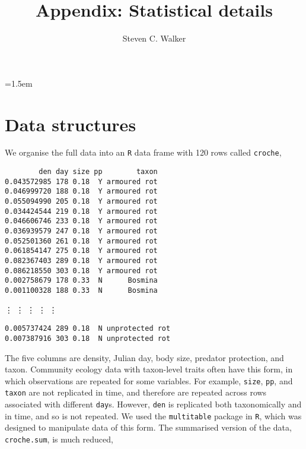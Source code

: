 \documentclass[12pt]{ecologyFORAPPENDIX}
\title{Appendix:  Statistical details}
\author{Steven C. Walker}
\begin{document}
\maketitle
\raggedright
\parindent=1.5em



\section{Data structures}

We organise the full data into an \texttt{R} data frame with 120 rows called \texttt{croche},
\vspace{-18pt}
\singlespace
\begin{verbatim}
        den day size pp        taxon
0.043572985 178 0.18  Y armoured rot
0.046999720 188 0.18  Y armoured rot
0.055094990 205 0.18  Y armoured rot
0.034424544 219 0.18  Y armoured rot
0.046606746 233 0.18  Y armoured rot
0.036939579 247 0.18  Y armoured rot
0.052501360 261 0.18  Y armoured rot
0.061854147 275 0.18  Y armoured rot
0.082367403 289 0.18  Y armoured rot
0.086218550 303 0.18  Y armoured rot
0.002758679 178 0.33  N      Bosmina
0.001100328 188 0.33  N      Bosmina
\end{verbatim}
\vspace{-13pt}
\hspace{35pt}
\vdots
\hspace{38pt}
\vdots
\hspace{20pt}
\vdots
\hspace{18pt}
\vdots
\hspace{40pt}
\vdots
\vspace{-10pt}
\begin{verbatim}
0.005737424 289 0.18  N unprotected rot
0.007387916 303 0.18  N unprotected rot
\end{verbatim}
\doublespace

\noindent The five columns are density, Julian day, body size, predator protection, and taxon.  Community ecology data with taxon-level traits often have this form, in which observations are repeated for some variables.  For example, \texttt{size}, \texttt{pp}, and \texttt{taxon} are not replicated in time, and therefore are repeated across rows associated with different \texttt{day}s.  However, \texttt{den} is replicated both taxonomically and in time, and so is not repeated.  We used the \texttt{multitable} package in \texttt{R}, which was designed to manipulate data of this form.  The summarised version of the data, \texttt{croche.sum}, is much reduced,
\end{document}

